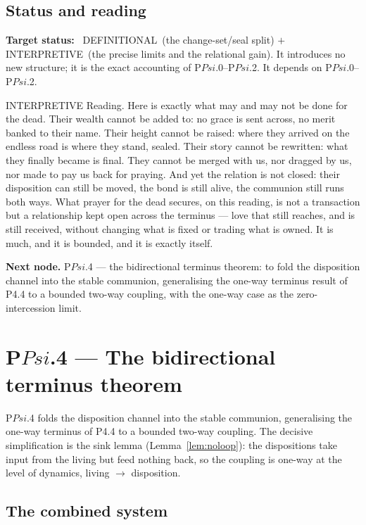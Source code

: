 \documentclass[11pt,a4paper]{article}
\def\Psi{Psi}%
\def\emph#1{#1}%
\newcommand{\stDef}{\textcolor{cDef}{\textsf{\small DEFINITIONAL}}}
\newcommand{\stInterp}{\textcolor{cInt}{\textsf{\small INTERPRETIVE}}}
\theoremstyle{definition}
\theoremstyle{plain}
\theoremstyle{remark}
\begin{document}
\subsection{Status and reading}

\textbf{Target status:}~
\stDef\ (the change-set/seal split) \(+\) \stInterp\ (the precise limits and the relational
gain). It introduces no new structure; it is the exact accounting of P$\Psi$.0--P$\Psi$.2. It
depends on P$\Psi$.0--P$\Psi$.2.

\medskip
\stInterp\quad
\emph{Reading.}
Here is exactly what may and may not be done for the dead. Their wealth cannot be added to:
no grace is sent across, no merit banked to their name. Their height cannot be raised: where
they arrived on the endless road is where they stand, sealed. Their story cannot be rewritten:
what they finally became is final. They cannot be merged with us, nor dragged by us, nor made
to pay us back for praying. And yet the relation is not closed: their disposition can still be
moved, the bond is still alive, the communion still runs both ways. What prayer for the dead
secures, on this reading, is not a transaction but a relationship kept open across the
terminus --- love that still reaches, and is still received, without changing what is fixed or
trading what is owned. It is much, and it is bounded, and it is exactly itself.

\medskip
\textbf{Next node.} P$\Psi$.4 --- the bidirectional terminus theorem: to fold the disposition
channel into the stable communion, generalising the one-way terminus result of P4.4 to a
bounded two-way coupling, with the one-way case as the zero-intercession limit.

\section{P$\Psi$.4 --- The bidirectional terminus theorem}

P$\Psi$.4 folds the disposition channel into the stable communion, generalising the one-way
terminus of P4.4 to a bounded two-way coupling. The decisive simplification is the sink lemma
(Lemma~\ref{lem:noloop}): the dispositions take input from the living but feed nothing back, so
the coupling is one-way at the level of dynamics, living \(\to\) disposition.

\subsection{The combined system}
\end{document}
